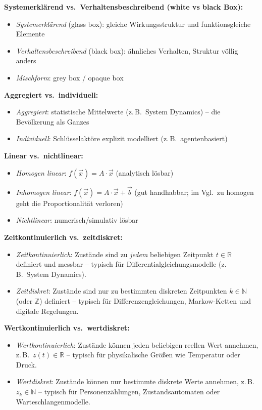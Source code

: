 \textbf{Systemerklärend vs.\ Verhaltensbeschreibend (white vs black Box):}
\begin{itemize}[leftmargin=1.5em]
    \item \textit{Systemerklärend} (glass box): gleiche Wirkungsstruktur und funktionsgleiche Elemente
    \item \textit{Verhaltensbeschreibend} (black box): ähnliches Verhalten, Struktur völlig anders
    \item \textit{Mischform}: grey box / opaque box
\end{itemize}

\textbf{Aggregiert vs.\ individuell:}
\begin{itemize}[leftmargin=1.5em]
    \item \textit{Aggregiert}: statistische Mittelwerte (z.\,B.\  System Dynamics) -- die Bevölkerung als Ganzes
    \item \textit{Individuell}: Schlüsselaktöre explizit modelliert (z.\,B.\  agentenbasiert)
\end{itemize}

\textbf{Linear vs.\ nichtlinear:}
\begin{itemize}[leftmargin=1.5em]
    \item \textit{Homogen linear}: $f(\vec{x}) = A \cdot \vec{x}$ (analytisch lösbar)
    \item \textit{Inhomogen linear}: $f(\vec{x}) = A \cdot \vec{x} + \vec{b}$ (gut handhabbar; im Vgl.\ zu homogen geht die Proportionalität verloren)
    \item \textit{Nichtlinear}: numerisch/simulativ lösbar
\end{itemize}

\textbf{Zeitkontinuierlich vs.\ zeitdiskret:}
\begin{itemize}[leftmargin=1.5em]
    \item \textit{Zeitkontinuierlich}: Zustände sind zu \emph{jedem} beliebigen Zeitpunkt $t \in \mathbb{R}$ definiert und messbar -- typisch für Differentialgleichungsmodelle (z.\,B.\ System Dynamics).
    \item \textit{Zeitdiskret}: Zustände sind nur zu bestimmten diskreten Zeitpunkten $k \in \mathbb{N}$ (oder $\mathbb{Z}$) definiert -- typisch für Differenzengleichungen, Markow-Ketten und digitale Regelungen.
\end{itemize}

\textbf{Wertkontinuierlich vs.\ wertdiskret:}
\begin{itemize}[leftmargin=1.5em]
    \item \textit{Wertkontinuierlich}: Zustände können jeden beliebigen reellen Wert annehmen, z.\,B.\ $z(t) \in \mathbb{R}$ -- typisch für physikalische Größen wie Temperatur oder Druck.
    \item \textit{Wertdiskret}: Zustände können nur bestimmte diskrete Werte annehmen, z.\,B.\ $z_k \in \mathbb{N}$ -- typisch für Personenzählungen, Zustandsautomaten oder Warteschlangenmodelle.
\end{itemize}

